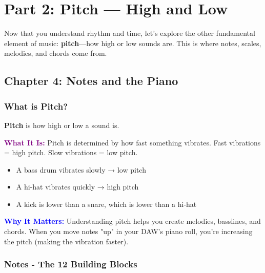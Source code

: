 \documentclass[11pt,letterpaper]{article}
\newcommand{\purple}[1]{\textcolor{purple}{\textbf{#1}}}
\newcommand{\bluepurple}[1]{\textcolor{blue}{\textbf{#1}}}
\begin{document}
\newpage


\section{Part 2: Pitch — High and Low}

Now that you understand rhythm and time, let's explore the other fundamental element of music: \textbf{pitch}—how high or low sounds are. This is where notes, scales, melodies, and chords come from.


\subsection{Chapter 4: Notes and the Piano}

\subsubsection{What is Pitch?}

\textbf{Pitch} is how high or low a sound is.

\textbf{\purple{What It Is:}} Pitch is determined by how fast something vibrates. Fast vibrations = high pitch. Slow vibrations = low pitch.

\begin{itemize}[leftmargin=*]
\item A bass drum vibrates slowly → low pitch
\item A hi-hat vibrates quickly → high pitch
\item A kick is lower than a snare, which is lower than a hi-hat
\end{itemize}

\textbf{\bluepurple{Why It Matters:}} Understanding pitch helps you create melodies, basslines, and chords. When you move notes "up" in your DAW's piano roll, you're increasing the pitch (making the vibration faster).

\subsubsection{Notes - The 12 Building Blocks}
\end{document}
